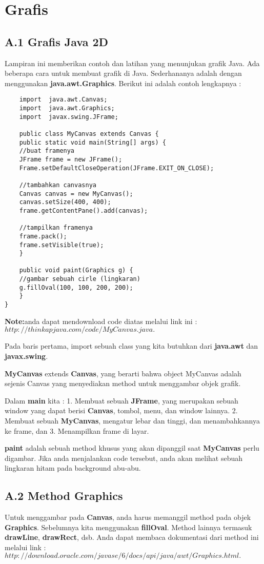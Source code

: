 \chapter{Grafis}
\section{A.1 Grafis Java 2D}
Lampiran ini memberikan contoh dan latihan yang menunjukan grafik Java. Ada beberapa cara untuk membuat grafik di Java. Sederhananya adalah dengan menggunakan \textbf{java.awt.Graphics}. Berikut ini adalah contoh lengkapnya :

\begin{lstlisting}
	import  java.awt.Canvas;
	import  java.awt.Graphics;
	import  javax.swing.JFrame;
	
	public class MyCanvas extends Canvas {
	public static void main(String[] args) {
	//buat framenya
	JFrame frame = new JFrame();
	Frame.setDefaultCloseOperation(JFrame.EXIT_ON_CLOSE);
	
	//tambahkan canvasnya
	Canvas canvas = new MyCanvas();
	canvas.setSize(400, 400);
	frame.getContentPane().add(canvas);
	
	//tampilkan framenya
	frame.pack();
	frame.setVisible(true);
	}
	
	public void paint(Graphics g) {
	//gambar sebuah cirle (lingkaran)
	g.fillOval(100, 100, 200, 200);
	}
}
\end{lstlisting}

\textbf{Note:}anda dapat mendownload code diatas melalui link ini : $http://thinkapjava.com/code/MyCanvas.java.$

Pada baris pertama, import sebuah class yang kita butuhkan dari \textbf{java.awt} dan \textbf{javax.swing}.

\textbf{MyCanvas} extends \textbf{Canvas}, yang berarti bahwa object MyCanvas adalah sejenis Canvas yang menyediakan method untuk menggambar objek grafik.

Dalam \textbf{main} kita :
1.	Membuat sebuah \textbf{JFrame}, yang merupakan sebuah window yang dapat berisi \textbf{Canvas}, tombol, menu, dan window lainnya.
2.	Membuat sebuah \textbf{MyCanvas}, mengatur lebar dan tinggi, dan menambahkannya ke frame, dan
3.	Menampilkan frame di layar.

\textbf{paint} adalah sebuah method khusus yang akan dipanggil saat \textbf{MyCanvas} perlu digambar. Jika anda menjalankan code tersebut, anda akan melihat sebuah lingkaran hitam pada background abu-abu.

\section{A.2 Method Graphics}
Untuk menggambar pada \textbf{Canvas}, anda harus memanggil method pada objek \textbf{Graphics}. Sebelumnya kita menggunakan \textbf{fillOval}. Method lainnya termasuk \textbf{drawLine}, \textbf{drawRect}, dsb. Anda dapat membaca dokumentasi dari method ini melalui link : 
$http://download.oracle.com/javase/6/docs/api/java/awt/Graphics.html.$

